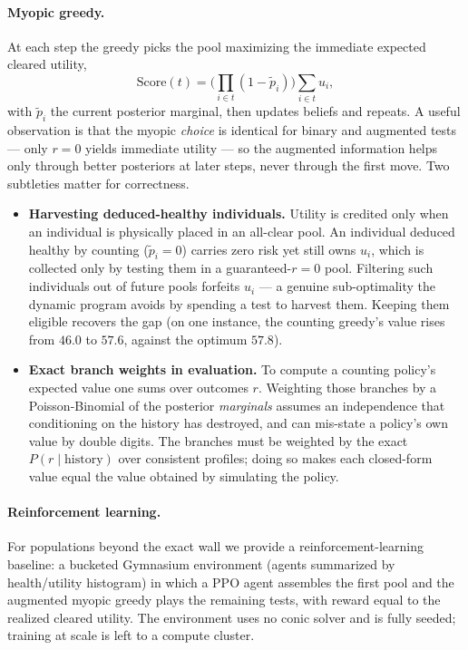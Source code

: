 \documentclass[11pt]{article}
\begin{document}
\paragraph{Myopic greedy.}
At each step the greedy picks the pool maximizing the immediate expected cleared
utility,
\[
  \mathrm{Score}(t)=\Big(\textstyle\prod_{i\in t}(1-\tilde p_i)\Big)
  \sum_{i\in t} u_i,
\]
with $\tilde p_i$ the current posterior marginal, then updates beliefs and
repeats. A useful observation is that the myopic \emph{choice} is identical for
binary and augmented tests --- only $r=0$ yields immediate utility --- so the
augmented information helps only through better posteriors at later steps, never
through the first move. Two subtleties matter for correctness.
\begin{itemize}
  \item \textbf{Harvesting deduced-healthy individuals.} Utility is credited only
  when an individual is physically placed in an all-clear pool. An individual
  deduced healthy by counting ($\tilde p_i=0$) carries zero risk yet still owns
  $u_i$, which is collected only by testing them in a guaranteed-$r{=}0$ pool.
  Filtering such individuals out of future pools forfeits $u_i$ --- a genuine
  sub-optimality the dynamic program avoids by spending a test to harvest them.
  Keeping them eligible recovers the gap (on one instance, the counting greedy's
  value rises from $46.0$ to $57.6$, against the optimum $57.8$).
  \item \textbf{Exact branch weights in evaluation.} To compute a counting
  policy's expected value one sums over outcomes $r$. Weighting those branches by
  a Poisson-Binomial of the posterior \emph{marginals} assumes an independence
  that conditioning on the history has destroyed, and can mis-state a policy's
  own value by double digits. The branches must be weighted by the exact
  $P(r\mid\text{history})$ over consistent profiles; doing so makes each
  closed-form value equal the value obtained by simulating the policy.
\end{itemize}

\paragraph{Reinforcement learning.}
For populations beyond the exact wall we provide a reinforcement-learning
baseline: a bucketed Gymnasium environment (agents summarized by health/utility
histogram) in which a PPO agent assembles the first pool and the augmented myopic
greedy plays the remaining tests, with reward equal to the realized cleared
utility. The environment uses no conic solver and is fully seeded; training at
scale is left to a compute cluster.
\end{document}
